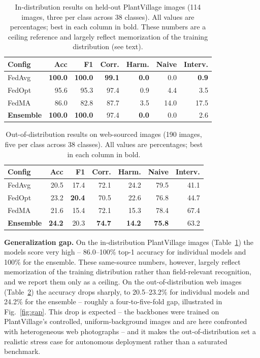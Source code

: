 \documentclass[conference]{IEEEtran}
\begin{document}
\begin{table}[t]
\centering
\caption{In-distribution results on held-out PlantVillage images (114 images, three per class across 38 classes). All values are percentages; best in each column in bold. These numbers are a ceiling reference and largely reflect memorization of the training distribution (see text).}
\label{tab:results_id}
\small
\setlength{\tabcolsep}{4pt}
\begin{tabular}{lrrrrrr}
\toprule
\textbf{Config} & \textbf{Acc} & \textbf{F1} & \textbf{Corr.} & \textbf{Harm.} & \textbf{Naive} & \textbf{Interv.} \\
\midrule
FedAvg & \textbf{100.0} & \textbf{100.0} & \textbf{99.1} & \textbf{0.0} & 0.0 & \textbf{0.9} \\
FedOpt & 95.6 & 95.3 & 97.4 & 0.9 & 4.4 & 3.5 \\
FedMA & 86.0 & 82.8 & 87.7 & 3.5 & 14.0 & 17.5 \\
\textbf{Ensemble} & \textbf{100.0} & \textbf{100.0} & 97.4 & \textbf{0.0} & 0.0 & 2.6 \\
\bottomrule
\end{tabular}
\end{table}

\begin{table}[t]
\centering
\caption{Out-of-distribution results on web-sourced images (190 images, five per class across 38 classes). All values are percentages; best in each column in bold.}
\label{tab:results_ood}
\small
\setlength{\tabcolsep}{4pt}
\begin{tabular}{lrrrrrr}
\toprule
\textbf{Config} & \textbf{Acc} & \textbf{F1} & \textbf{Corr.} & \textbf{Harm.} & \textbf{Naive} & \textbf{Interv.} \\
\midrule
FedAvg & 20.5 & 17.4 & 72.1 & 24.2 & 79.5 & 41.1 \\
FedOpt & 23.2 & \textbf{20.4} & 70.5 & 22.6 & 76.8 & 44.7 \\
FedMA & 21.6 & 15.4 & 72.1 & 15.3 & 78.4 & 67.4 \\
\textbf{Ensemble} & \textbf{24.2} & 20.3 & \textbf{74.7} & \textbf{14.2} & \textbf{75.8} & 63.2 \\
\bottomrule
\end{tabular}
\end{table}

\textbf{Generalization gap.} On the in-distribution PlantVillage images (Table~\ref{tab:results_id}) the models score very high -- 86.0--100\% top-1 accuracy for individual models and 100\% for the ensemble. These same-source numbers, however, largely reflect memorization of the training distribution rather than field-relevant recognition, and we report them only as a ceiling. On the out-of-distribution web images (Table~\ref{tab:results_ood}) the accuracy drops sharply, to 20.5--23.2\% for individual models and 24.2\% for the ensemble -- roughly a four-to-five-fold gap, illustrated in Fig.~\ref{fig:gap}. This drop is expected -- the backbones were trained on PlantVillage's controlled, uniform-background images and are here confronted with heterogeneous web photographs -- and it makes the out-of-distribution set a realistic stress case for autonomous deployment rather than a saturated benchmark.
\end{document}
